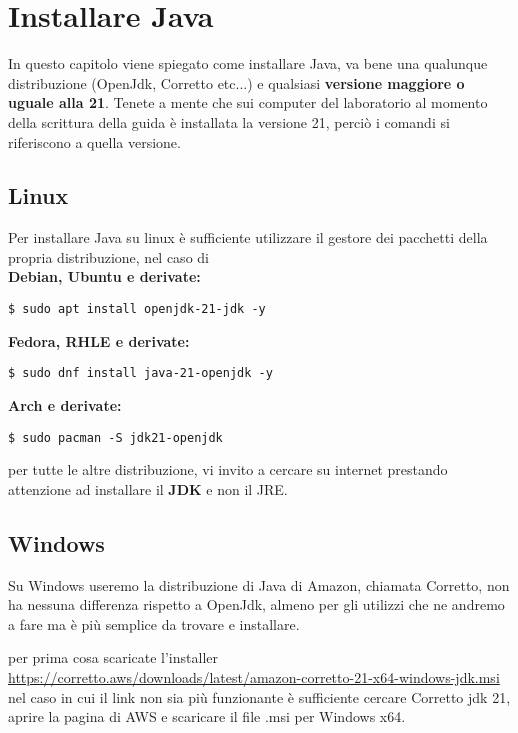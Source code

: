 \section{Installare Java}

    In questo capitolo viene spiegato come installare Java, va bene una qualunque distribuzione (OpenJdk, Corretto etc...) e qualsiasi \textbf{versione maggiore o uguale alla 21}. Tenete a mente 
    che sui computer del laboratorio al momento della scrittura della guida è installata la versione 21, perciò i comandi si riferiscono a quella versione.

    \subsection{Linux}
        Per installare Java su linux è sufficiente utilizzare il gestore dei pacchetti della propria distribuzione, nel caso di\\
        \textbf{Debian, Ubuntu e derivate:}
        \begin{ret}
            \texttt{\$ sudo apt install openjdk-21-jdk -y}
        \end{ret}
        
        \textbf{Fedora, RHLE e derivate:}
        \begin{ret}
            \texttt{\$ sudo dnf install java-21-openjdk -y}
        \end{ret}

        \textbf{Arch e derivate:}
        \begin{ret}
            \texttt{\$ sudo pacman -S jdk21-openjdk}
        \end{ret}
        per tutte le altre distribuzione, vi invito a cercare su internet prestando attenzione ad installare il \textbf{JDK} e non il JRE.
    
    \subsection{Windows}
        Su Windows useremo la distribuzione di Java di Amazon, chiamata Corretto, non ha nessuna differenza rispetto a OpenJdk, almeno per gli utilizzi che ne andremo a fare
        ma è più semplice da trovare e installare.

        per prima cosa scaricate l'installer \url{https://corretto.aws/downloads/latest/amazon-corretto-21-x64-windows-jdk.msi}\\
        nel caso in cui il link non sia più funzionante è sufficiente cercare Corretto jdk 21, aprire la pagina di AWS e scaricare il file .msi per Windows x64.
    
